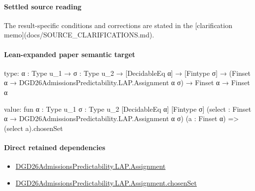 \documentclass[10pt]{article}
\begin{document}
\paragraph{Settled source reading}
The result-\allowbreak{}specific conditions and corrections are stated in the [clarification memo](docs/\allowbreak{}SOURCE\_\allowbreak{}CLARIFICATIONS.\allowbreak{}md).\allowbreak{}

\paragraph{Lean-expanded paper semantic target}
\begin{ReviewVerbatim}
type:
{α : Type u_1} →
  {σ : Type u_2} →
    [DecidableEq α] → [Fintype σ] → (Finset α → DGD26AdmissionsPredictability.LAP.Assignment α σ) → Finset α → Finset α

value:
fun {α : Type u_1} {σ : Type u_2} [DecidableEq α] [Fintype σ]
    (select : Finset α → DGD26AdmissionsPredictability.LAP.Assignment α σ) (a : Finset α) =>
  (select a).chosenSet
\end{ReviewVerbatim}

\paragraph{Direct retained dependencies}
\begin{itemize}\raggedright
\item \hyperlink{governing-declaration-a9620f375b9ffc53}{DGD26\allowbreak{}Admissions\allowbreak{}Predictability.\allowbreak{}LAP.\allowbreak{}Assignment}
\item \hyperlink{governing-declaration-dd23aabf9cea408a}{DGD26\allowbreak{}Admissions\allowbreak{}Predictability.\allowbreak{}LAP.\allowbreak{}Assignment.\allowbreak{}chosen\allowbreak{}Set}
\end{itemize}
\end{document}
